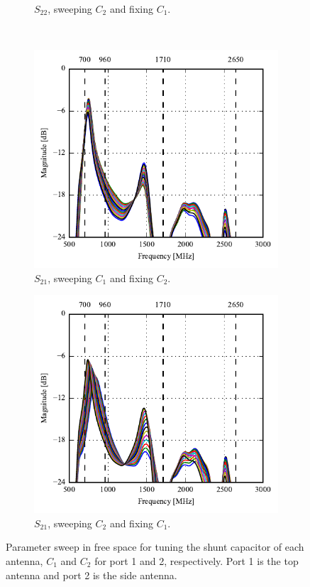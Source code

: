 \begin{figure}[htbp]
\begin{subfigure}[b]{0.49\linewidth}
        \caption{$S_{22}$, sweeping $C_2$ and fixing $C_1$.}
        \label{fig:ant1_s22}
    \end{subfigure}
~
    \begin{subfigure}[b]{0.49\linewidth}
        \centering
        \includegraphics{img/tech_sol/monopole/s21-s11}
        \caption{$S_{21}$, sweeping $C_1$ and fixing $C_2$.}
        \label{fig:ant1_s11}
    \end{subfigure}
    \hfill
    \begin{subfigure}[b]{0.49\linewidth}
        \centering
        \includegraphics{img/tech_sol/monopole/s21-s22}
        \caption{$S_{21}$, sweeping $C_2$ and fixing $C_1$.}
        \label{fig:ant1_s22}
    \end{subfigure}
    \caption{Parameter sweep in free space for tuning the shunt capacitor of each antenna, $C_1$ and $C_2$ for port 1 and 2, respectively. Port 1 is the top antenna and port 2 is the side antenna.}
    \label{fig:sparam_mono_free_space}
\end{figure}


